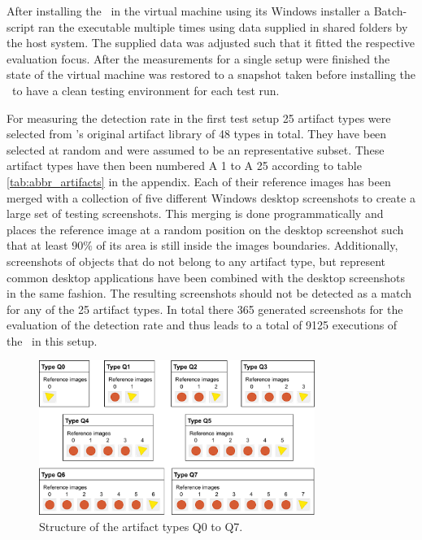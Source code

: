 After installing the \vd~in the virtual machine using its Windows installer a Batch-script ran the executable multiple times using data supplied in shared folders by the host system. The supplied data was adjusted such that it fitted the respective evaluation focus. After the measurements for a single setup were finished the state of the virtual machine was restored to a snapshot taken before installing the \vd~to have a clean testing environment for each test run.

For measuring the detection rate in the first test setup 25 artifact types were selected from \ape's original artifact library of 48 types in total. They have been selected at random and were assumed to be an representative subset. These artifact types have then been numbered A 1 to A 25 according to table \ref{tab:abbr_artifacts} in the appendix. Each of their reference images has been merged with a collection of five different Windows desktop screenshots to create a large set of testing screenshots. This merging is done programmatically and places the reference image at a random position on the desktop screenshot such that at least $90\%$ of its area is still inside the images boundaries. Additionally, screenshots of objects that do not belong to any artifact type, but represent common desktop applications have been combined with the desktop screenshots in the same fashion. The resulting screenshots should not be detected as a match for any of the 25 artifact types. In total there 365 generated screenshots for the evaluation of the detection rate and thus leads to a total of 9125 executions of the \vd~in this setup.

\begin{figure}[h]
	\centering
	\includegraphics[width=0.8\textwidth]{fig/artifact_types_t2}
	\caption{Structure of the artifact types Q0 to Q7.}\label{fig:arttypes-q0q7}
\end{figure}

